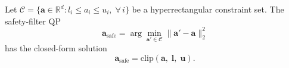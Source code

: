 %

\begin{proposition}
\label{prop:qp-clip}
Let $\mathcal{C} = \{\mathbf{a} \in \mathbb{R}^d : l_i \leq a_i \leq u_i,\; \forall\, i\}$ be a hyperrectangular constraint set. The safety-filter QP
\begin{equation}
  \mathbf{a}_{\mathrm{safe}} = \arg\min_{\mathbf{a}' \in \mathcal{C}} \|\mathbf{a}' - \mathbf{a}\|_2^2
\end{equation}
has the closed-form solution
\begin{equation}
  \mathbf{a}_{\mathrm{safe}} = \mathrm{clip}(\mathbf{a},\; \mathbf{l},\; \mathbf{u}).
\end{equation}
\end{proposition}

